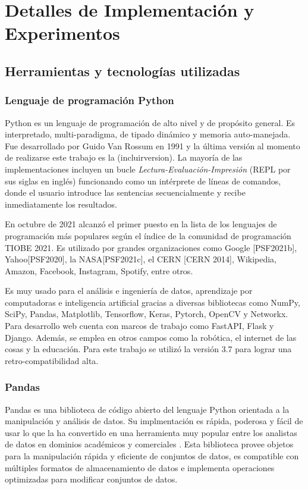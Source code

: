 \chapter{Detalles de Implementación y Experimentos}\label{chapter:implementation}


\section{Herramientas y tecnolog\'ias utilizadas}

\subsection{Lenguaje de programaci\'on Python}

Python es un lenguaje de programaci\'on de alto nivel y de prop\'osito
general. Es interpretado, multi-paradigma, de tipado din\'amico y memoria
auto-manejada. Fue desarrollado por Guido Van Rossum en 1991 y la \'ultima
versi\'on al momento de realizarse este trabajo es la (incluirversion).
La mayor\'ia de las implementaciones incluyen un bucle \textit{Lectura-Evaluaci\'on-Impresi\'on}
(REPL por sus siglas en ingl\'es) funcionando como un int\'erprete de l\'ineas
de comandos, donde el usuario introduce las sentencias secuencialmente y recibe
inmediatamente los resultados.

En octubre de 2021 alcanz\'o el primer puesto en la lista de los lenguajes
de programaci\'on m\'as populares seg\'un el \'indice de la comunidad de
programaci\'on TIOBE 2021. Es utilizado por grandes organizaciones como
Google [PSF2021b], Yahoo[PSF2020], la NASA[PSF2021c], el CERN [CERN 2014],
Wikipedia, Amazon, Facebook, Instagram, Spotify, entre otros.

Es muy usado para el an\'alisis e ingenier\'ia de datos, aprendizaje
por computadoras e inteligencia artificial gracias a diversas bibliotecas
como NumPy, SciPy, Pandas, Matplotlib, Tensorflow, Keras, Pytorch, OpenCV y Networkx.
Para desarrollo web cuenta con marcos de trabajo como FastAPI, Flask y Django.
Adem\'as, se emplea en otros campos como la rob\'otica, el internet de las
cosas y la educaci\'on.
Para este trabajo se utiliz\'o la versi\'on 3.7 para lograr una retro-compatibilidad
alta.


\subsection{Pandas}
Pandas es una biblioteca de c\'odigo abierto del lenguaje Python orientada
a la manipulaci\'on y an\'alisis de datos. Su implmentaci\'on es
r\'apida, poderosa y f\'acil de usar lo que la ha convertido en
una herramienta muy popular entre los analistas de datos en dominios 
acad\'emicos y comerciales \cite{pandas2022}.
Esta biblioteca provee objetos para la manipulaci\'on r\'apida
y eficiente de conjuntos de datos, es compatible con m\'ultiples formatos
de almacenamiento de datos e implementa operaciones optimizadas para
modificar conjuntos de datos.

